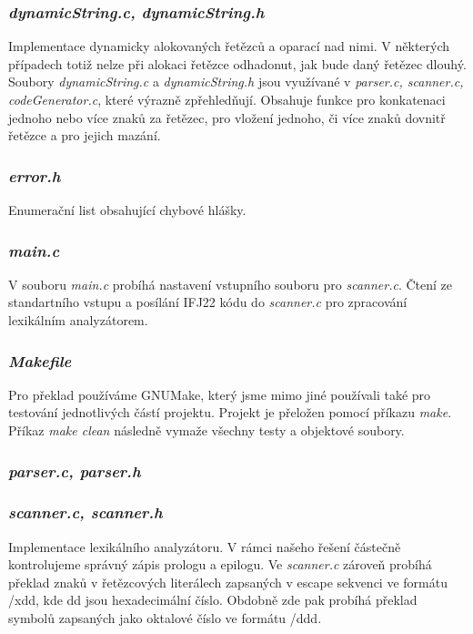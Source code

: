 \documentclass{article}
\begin{document}
\subsubsection{\emph{dynamicString.c, dynamicString.h}}
Implementace dynamicky alokovaných řetězců a oparací nad nimi. V některých případech totiž nelze při alokaci řetězce odhadonut, jak bude daný řetězec dlouhý. Soubory \emph{dynamicString.c} a \emph{dynamicString.h} jsou využívané v \emph{parser.c, scanner.c, codeGenerator.c}, které výrazně zpřehledňují. Obsahuje funkce pro konkatenaci jednoho nebo více znaků za řetězec, pro vložení jednoho, či více znaků dovnitř řetězce a pro jejich mazání.

\subsubsection{\emph{error.h}}
Enumerační list obsahující chybové hlášky.

\subsubsection{\emph{main.c}}
V souboru \emph{main.c} probíhá nastavení vstupního souboru pro \emph{scanner.c}. Čtení ze standartního vstupu a posílání IFJ22 kódu do \emph{scanner.c} pro zpracování lexikálním analyzátorem.

\subsubsection{\emph{Makefile}}
Pro překlad používáme GNUMake, který jsme mimo jiné používali také pro testování jednotlivých částí projektu. Projekt je přeložen pomocí příkazu \emph{make}. Příkaz \emph{make clean} následně vymaže všechny testy a objektové soubory.

\subsubsection{\emph{parser.c, parser.h}}

\subsubsection{\emph{scanner.c, scanner.h}}
Implementace lexikálního analyzátoru. V rámci našeho řešení částečně kontrolujeme správný zápis prologu a epilogu. Ve \emph{scanner.c} zároveň probíhá překlad znaků v řetězcových literálech zapsaných v escape sekvenci ve formátu /xdd, kde dd jsou hexadecimální číslo. Obdobně zde pak probíhá překlad symbolů zapsaných jako oktalové číslo ve formátu /ddd.
\end{document}
